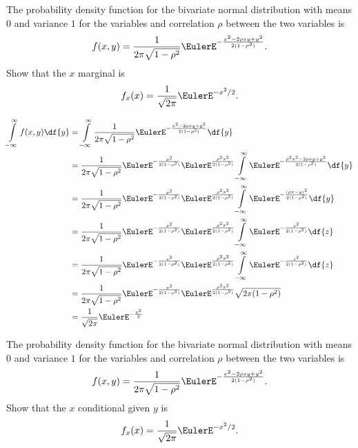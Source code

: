 \documentclass[12pt]{article}
\begin{document}
\begin{exercise}
    The probability density function for the bivariate normal
    distribution with means \( 0 \) and variance \( 1 \) for the
    variables and correlation \( \rho \) between the two variables is
    \[
        f(x, y) = \frac{1}{2\pi \sqrt{1 - \rho^2}} \EulerE^{- \frac{x^2
        - 2 \rho x y + y^2}{2(1-\rho^2)}}.
    \] Show that the \( x \) marginal is
    \[
        f_{x}(x) = \frac{1}{\sqrt{2\pi}} \EulerE^{-x^2/2}.
    \]
\end{exercise}
\begin{solution}
    \begin{align*}
        \int\limits_{-\infty}^{\infty}f(x, y) \df{y} &= \int\limits_{-\infty}^
        {\infty}\frac{1}{2\pi \sqrt{1 - \rho^2}} \EulerE^{- \frac{x^2 -
        2 \rho x y + y^2}{2(1-\rho^2)}} \df{y} \\
        &= \frac{1}{2\pi \sqrt{1 - \rho^2}} \EulerE^{- \frac{x^2}{2(1-\rho^2)}}
        \EulerE^{\frac{\rho^2 x^2}{2(1-\rho^2)}} \int\limits_{-\infty}^{\infty}
        \EulerE^{- \frac{\rho^2 x^2- 2 \rho x y + y^2}{2(1-\rho^2)}} \df
        {y} \\
        &= \frac{1}{2\pi \sqrt{1 - \rho^2}} \EulerE^{- \frac{x^2}{2(1-\rho^2)}}
        \EulerE^{\frac{\rho^2 x^2}{2(1-\rho^2)}} \int\limits_{-\infty}^{\infty}
        \EulerE^{- \frac{(\rho x - y)^2}{2(1-\rho^2)}} \df{y} \\
        &= \frac{1}{2\pi \sqrt{1 - \rho^2}} \EulerE^{- \frac{x^2}{2(1-\rho^2)}}
        \EulerE^{\frac{\rho^2 x^2}{2(1-\rho^2)}} \int\limits_{-\infty}^{\infty}
        \EulerE^{- \frac{z^2}{2(1-\rho^2)}} \df{z} \\
        &= \frac{1}{2\pi \sqrt{1 - \rho^2}} \EulerE^{- \frac{x^2}{2(1-\rho^2)}}
        \EulerE^{\frac{\rho^2 x^2}{2(1-\rho^2)}} \int\limits_{-\infty}^{\infty}
        \EulerE^{- \frac{z^2}{2(1-\rho^2)}} \df{z} \\
        &= \frac{1}{2\pi \sqrt{1 - \rho^2}} \EulerE^{- \frac{x^2}{2(1-\rho^2)}}
        \EulerE^{\frac{\rho^2 x^2}{2(1-\rho^2)}} \sqrt{2\pi(1 - \rho^2)}
        \\
        &= \frac{1}{\sqrt{2\pi}} \EulerE^{- \frac{x^2}{2}}
    \end{align*}
\end{solution}
\begin{exercise}
    The probability density function for the bivariate normal
    distribution with means \( 0 \) and variance \( 1 \) for the
    variables and correlation \( \rho \) between the two variables is
    \[
        f(x, y) = \frac{1}{2\pi \sqrt{1 - \rho^2}} \EulerE^{- \frac{x^2
        - 2 \rho x y + y^2}{2(1-\rho^2)}}.
    \] Show that the \( x \) conditional given \( y \)  is
    \[
        f_{x}(x) = \frac{1}{\sqrt{2\pi}} \EulerE^{-x^2/2}.
    \]
\end{exercise}
\end{document}
